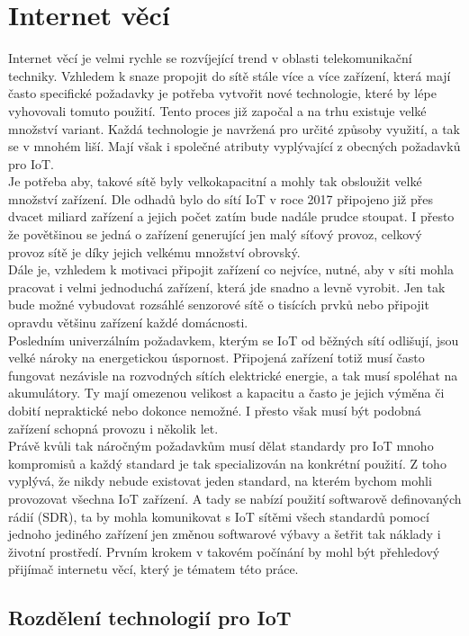 \documentclass{ctuthesis}
\begin{document}
\chapter{Internet věcí}
Internet věcí je velmi rychle se rozvíjející trend v oblasti telekomunikační techniky. Vzhledem k snaze propojit do sítě stále více a více zařízení, která mají často specifické požadavky je potřeba vytvořit nové technologie, které by lépe vyhovovali tomuto použití. Tento proces již započal a na trhu existuje velké množství variant. 
Každá technologie je navržená pro určité způsoby využití, a tak se v mnohém liší. Mají však i společné atributy vyplývající z obecných požadavků pro IoT.\\
Je potřeba aby, takové sítě byly velkokapacitní a mohly tak obsloužit velké množství zařízení. Dle odhadů bylo do sítí IoT v roce 2017 připojeno již přes dvacet miliard zařízení a jejich počet zatím bude nadále prudce stoupat. \cite{statista2018} I přesto že povětšinou se jedná o zařízení generující jen malý síťový provoz, celkový provoz sítě je díky jejich velkému množství obrovský.\\
Dále je, vzhledem k motivaci připojit zařízení co nejvíce, nutné, aby v síti mohla pracovat i velmi jednoduchá zařízení, která jde snadno a levně vyrobit. Jen tak bude možné vybudovat rozsáhlé senzorové sítě o tisících prvků nebo připojit opravdu většinu zařízení každé domácnosti.\\
Posledním univerzálním požadavkem, kterým se IoT od běžných sítí odlišují, jsou velké nároky na energetickou úspornost. Připojená zařízení totiž musí často fungovat nezávisle na rozvodných sítích elektrické energie, a tak musí spoléhat na akumulátory. Ty mají omezenou velikost a kapacitu a často je jejich výměna či dobití nepraktické nebo dokonce nemožné. I přesto však musí být podobná zařízení schopná provozu i několik let.
\\
Právě kvůli tak náročným požadavkům musí dělat standardy pro IoT mnoho kompromisů a každý standard je tak specializován na konkrétní použití. Z toho vyplývá, že nikdy nebude existovat jeden standard, na kterém bychom mohli provozovat všechna IoT zařízení. A tady se nabízí použití softwarově definovaných rádií (SDR), ta by mohla komunikovat s IoT sítěmi všech standardů pomocí jednoho jediného zařízení jen změnou softwarové výbavy a šetřit tak náklady i životní prostředí. Prvním krokem v takovém počínání by mohl být přehledový přijímač internetu věcí, který je tématem této práce.

\section{Rozdělení technologií pro IoT}
\end{document}
